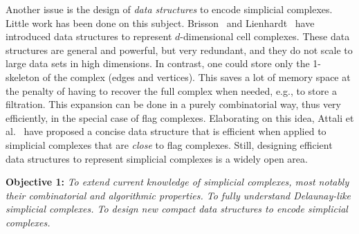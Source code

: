  
Another issue is the  design of {\em data structures } to encode simplicial complexes.
Little work has been done on this subject. Brisson~\cite{Brisson:1989:RGS:73833.73858} and
Lienhardt~\cite{DBLP:journals/ijcga/Lienhardt94} have introduced data
structures to represent $d$-dimensional cell complexes. These data
structures are general and powerful, but very redundant, and they do
not scale to large data sets in high dimensions.  In contrast, one
could store only the 1-skeleton of the complex (edges and vertices). This 
saves a lot of memory space at the penalty of having to recover the full complex when needed, e.g., to store a filtration. This expansion can be done in a purely combinatorial way, thus very efficiently, in the special case of flag complexes. Elaborating on this idea, Attali et al.~\cite{Attali2011} have proposed a concise data structure that is efficient when applied to simplicial complexes that are {\em close} to flag complexes. Still, designing efficient data structures to represent simplicial complexes is a widely open area.


\vspace{2mm}

{\bf Objective 1:} {\em 
To extend  current knowledge of simplicial complexes, most notably their combinatorial and algorithmic properties.   To fully understand Delaunay-like simplicial complexes.  To design new  compact data structures to encode simplicial complexes.}

